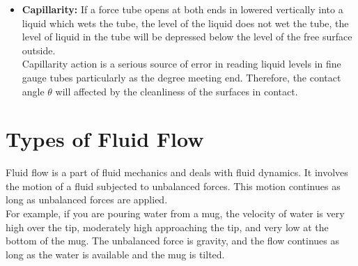 \documentclass[11pt]{report}
\newcommand{\bt}[1]{\textbf{#1}}
\begin{document}
\begin{itemize}[label=--]
		\item \bt{Capillarity: } If a force tube opens at both ends in lowered vertically into a liquid which wets the tube, the level of the liquid does not wet the tube, the level of liquid in the tube will be depressed below the level of the free surface outside.\\
		Capillarity action is a serious source of error in reading liquid levels in fine gauge tubes particularly as the degree meeting end. Therefore, the contact angle $\theta$ will affected by the cleanliness of the surfaces in contact.
	\end{itemize}
	
	\section{Types of Fluid Flow}
	Fluid flow is a part of fluid mechanics and deals with fluid dynamics. It involves the motion of a fluid subjected to unbalanced forces. This motion continues as long as unbalanced forces are applied.\\
	For example, if you are pouring water from a mug, the velocity of water is very high over the tip, moderately high approaching the tip, and very low at the bottom of the mug. The unbalanced force is gravity, and the flow continues as long as the water is available and the mug is tilted.\\
	
\end{document}
